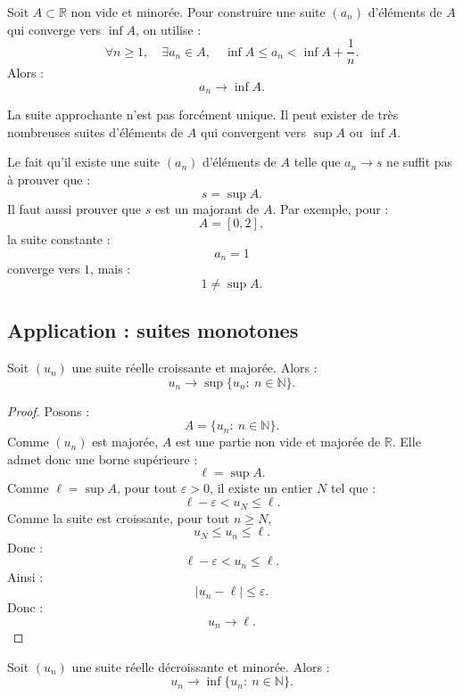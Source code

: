 \documentclass[11pt,a4paper]{article}
\newcommand{\N}{\mathbb N}
\newcommand{\R}{\mathbb R}
\begin{document}
\begin{methodbox}
Soit \(A\subset\R\) non vide et minorée.  
Pour construire une suite \((a_n)\) d'éléments de \(A\) qui converge vers \(\inf A\), on utilise :
\[
\forall n\geq1,\quad \exists a_n\in A,\quad
\inf A\leq a_n<\inf A+\frac1n.
\]
Alors :
\[
a_n\to\inf A.
\]
\end{methodbox}

\begin{erreurbox}
La suite approchante n'est pas forcément unique.  
Il peut exister de très nombreuses suites d'éléments de \(A\) qui convergent vers \(\sup A\) ou \(\inf A\).
\end{erreurbox}

\begin{erreurbox}
Le fait qu'il existe une suite \((a_n)\) d'éléments de \(A\) telle que \(a_n\to s\) ne suffit pas à prouver que :
\[
s=\sup A.
\]
Il faut aussi prouver que \(s\) est un majorant de \(A\).
Par exemple, pour :
\[
A=[0,2],
\]
la suite constante :
\[
a_n=1
\]
converge vers \(1\), mais :
\[
1\neq\sup A.
\]
\end{erreurbox}

\subsection{Application : suites monotones}

\begin{theorembox}
Soit \((u_n)\) une suite réelle croissante et majorée.  
Alors :
\[
u_n\to \sup\{u_n:\ n\in\N\}.
\]
\end{theorembox}

\begin{proof}
Posons :
\[
A=\{u_n:\ n\in\N\}.
\]
Comme \((u_n)\) est majorée, \(A\) est une partie non vide et majorée de \(\R\).  
Elle admet donc une borne supérieure :
\[
\ell=\sup A.
\]
Comme \(\ell=\sup A\), pour tout \(\varepsilon>0\), il existe un entier \(N\) tel que :
\[
\ell-\varepsilon<u_N\leq \ell.
\]
Comme la suite est croissante, pour tout \(n\geq N\),
\[
u_N\leq u_n\leq \ell.
\]
Donc :
\[
\ell-\varepsilon<u_n\leq \ell.
\]
Ainsi :
\[
|u_n-\ell|\leq\varepsilon.
\]
Donc :
\[
u_n\to\ell.
\]
\end{proof}

\begin{theorembox}
Soit \((u_n)\) une suite réelle décroissante et minorée.  
Alors :
\[
u_n\to \inf\{u_n:\ n\in\N\}.
\]
\end{theorembox}
\end{document}
